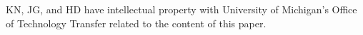 KN, JG, and HD have intellectual property with University of Michigan's Office of Technology Transfer related to the content of this paper.